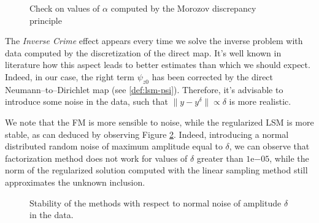 \documentclass[10pt, a4paper, twoside, openright]{book}
\theoremstyle{definition}
\theoremstyle{plain}
\theoremstyle{plain}
\theoremstyle{plain}
\theoremstyle{plain}
\theoremstyle{plain}
\theoremstyle{plain}
\theoremstyle{plain}
\theoremstyle{plain}
\begin{document}
\begin{center}
\begin{figure}%
\caption{Check on values of $\alpha$ computed by the Morozov discrepancy principle}
\label{fig:discrepancy_alpha}
\end{figure}
\end{center}

The \emph{Inverse Crime} effect appears every time we solve the inverse problem with data computed 
by the discretization of the direct map. It's well known in literature how this aspect leads to 
better estimates than which we should expect. Indeed, in our case, the right term $\psi_{z0}$ 
has been corrected by the direct Neumann--to--Dirichlet map (see \eqref{def:lsm-psi}). Therefore, it's advisable to 
introduce some noise in the data, such that $\|y - y^\delta\|\propto\delta$ is more realistic.

We note that the FM is more sensible to noise, while the regularized LSM is more stable, as can 
deduced by observing Figure \ref{fig:noise}. Indeed, introducing a normal distributed random noise of 
maximum amplitude equal to $\delta$, we can observe that factorization method does not work for 
values of $\delta$ greater than $\mathrm{1e}{-05}$, while the norm of the regularized solution computed with
the linear sampling method still approximates the unknown inclusion.

\begin{center}
\begin{figure}%
\caption{Stability of the methods with respect to normal noise of amplitude $\delta$ in the data.}
\label{fig:noise}
\end{figure}
\end{center}
\end{document}
